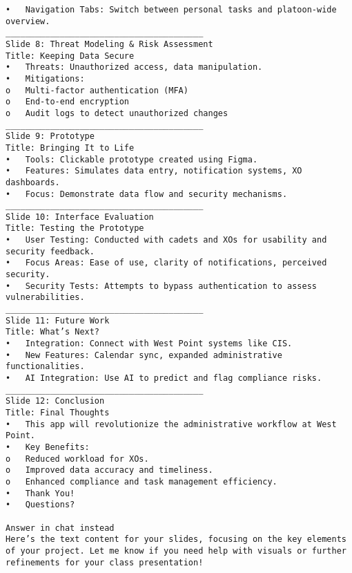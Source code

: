 \documentclass [11pt]{article}
\begin{document}
\begin{lstlisting}
•	Navigation Tabs: Switch between personal tasks and platoon-wide overview.
________________________________________
Slide 8: Threat Modeling & Risk Assessment
Title: Keeping Data Secure
•	Threats: Unauthorized access, data manipulation.
•	Mitigations:
o	Multi-factor authentication (MFA)
o	End-to-end encryption
o	Audit logs to detect unauthorized changes
________________________________________
Slide 9: Prototype
Title: Bringing It to Life
•	Tools: Clickable prototype created using Figma.
•	Features: Simulates data entry, notification systems, XO dashboards.
•	Focus: Demonstrate data flow and security mechanisms.
________________________________________
Slide 10: Interface Evaluation
Title: Testing the Prototype
•	User Testing: Conducted with cadets and XOs for usability and security feedback.
•	Focus Areas: Ease of use, clarity of notifications, perceived security.
•	Security Tests: Attempts to bypass authentication to assess vulnerabilities.
________________________________________
Slide 11: Future Work
Title: What’s Next?
•	Integration: Connect with West Point systems like CIS.
•	New Features: Calendar sync, expanded administrative functionalities.
•	AI Integration: Use AI to predict and flag compliance risks.
________________________________________
Slide 12: Conclusion
Title: Final Thoughts
•	This app will revolutionize the administrative workflow at West Point.
•	Key Benefits:
o	Reduced workload for XOs.
o	Improved data accuracy and timeliness.
o	Enhanced compliance and task management efficiency.
•	Thank You!
•	Questions?

Answer in chat instead
Here’s the text content for your slides, focusing on the key elements of your project. Let me know if you need help with visuals or further refinements for your class presentation!

\end{lstlisting}
\end{document}
